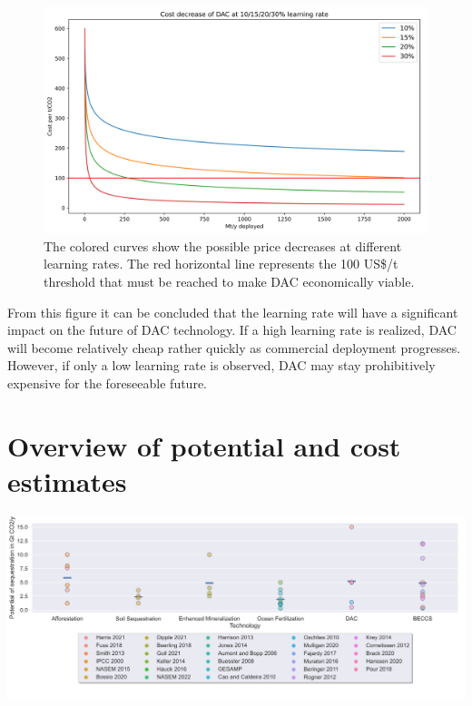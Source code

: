 \begin{figure}[ht!]
    \includegraphics[width=\textwidth]{figures/dac_learning.png}
    \caption{The colored curves show the possible price decreases at different learning rates. The red horizontal line represents the 100 US\$/t threshold that must be reached to make DAC economically viable.}
\end{figure}
\newpage
From this figure it can be concluded that the learning rate will have a significant impact on the future of DAC technology. If a high learning rate is realized, DAC will become relatively cheap rather quickly as commercial deployment progresses. However, if only a low learning rate is observed, DAC may stay prohibitively expensive for the foreseeable future.

\chapter{Overview of potential and cost estimates}

 \mbox{} \begin{center}
    \begin{sideways}%
    \captionsetup{margin=0cm}
         \begin{minipage}{1.2\linewidth}
            \includegraphics[width=550pt, keepaspectratio]{figures/potential.png}
         \vspace{0.2cm}
         \label{fig:xx}
         \end{minipage}
    \end{sideways}
    \end{center}

